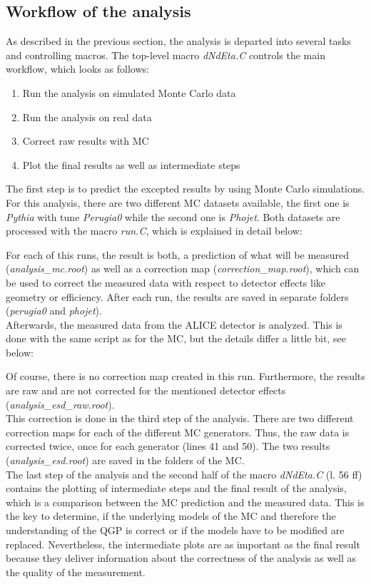 \documentclass{article}
\begin{document}
\subsection{Workflow of the analysis}
As described in the previous section, the analysis is departed into several tasks and controlling macros. The top-level macro \textit{dNdEta.C} controls the main workflow, which looks as follows:
\begin{enumerate}
\item Run the analysis on simulated Monte Carlo data
\item Run the analysis on real data
\item Correct raw results with MC
\item Plot the final results as well as intermediate steps
\end{enumerate}
The first step is to predict the excepted results by using Monte Carlo simulations. For this analysis, there are two different MC datasets available, the first one is \textit{Pythia} with tune \textit{Perugia0} while the second one is \textit{Phojet}. Both datasets are processed with the macro \textit{run.C}, which is explained in detail below:

For each of this runs, the result is both, a prediction of what will be measured (\textit{analysis\_mc.root}) as well as a correction map (\textit{correction\_map.root}), which can be used to correct the measured data with respect to detector effects like geometry or efficiency. After each run, the results are saved in separate folders (\textit{perugia0} and \textit{phojet}).\\
Afterwards, the measured data from the ALICE detector is analyzed. This is done with the same script as for the MC, but the details differ a little bit, see below:

Of course, there is no correction map created in this run. Furthermore, the results are raw and are not corrected for the mentioned detector effects (\textit{analysis\_esd\_raw.root}).\\
This correction is done in the third step of the analysis. There are two different correction maps for each of the different MC generators. Thus, the raw data is corrected twice, once for each generator (lines 41 and 50). The two results (\textit{analysis\_esd.root}) are saved in the folders of the MC.\\
The last step of the analysis and the second half of the macro \textit{dNdEta.C} (l. 56 ff) contains the plotting of intermediate steps and the final result of the analysis, which is a comparison between the MC prediction and the measured data. This is the key to determine, if the underlying models of the MC and therefore the understanding of the QGP is correct or if the models have to be modified are replaced. Nevertheless, the intermediate plots are as important as the final result because they deliver information about the correctness of the analysis as well as the quality of the measurement.
\end{document}
